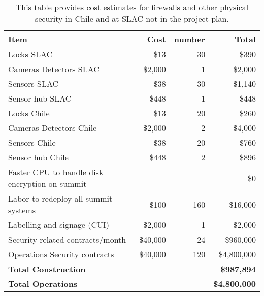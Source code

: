 \tiny \begin{longtable} {|p{}|r|r|r|} \caption{This table provides cost estimates for firewalls and other physical security in Chile and at SLAC not in the project plan. \label{tab:firewalls}}\\ 
\hline 
\textbf{Item}&\textbf{Cost}&\textbf{number}&\textbf{Total} \\ \hline
{Locks SLAC}&{\$13}&{30}&{\$390} \\ \hline
{Cameras Detectors  SLAC}&{\$2,000}&{1}&{\$2,000} \\ \hline
{Sensors SLAC}&{\$38}&{30}&{\$1,140} \\ \hline
{Sensor hub SLAC}&{\$448}&{1}&{\$448} \\ \hline
{Locks Chile}&{\$13}&{20}&{\$260} \\ \hline
{Cameras Detectors Chile}&{\$2,000}&{2}&{\$4,000} \\ \hline
{Sensors Chile}&{\$38}&{20}&{\$760} \\ \hline
{Sensor hub Chile}&{\$448}&{2}&{\$896} \\ \hline
{Faster CPU to handle disk encryption on summit}&{}&{}&{\$0} \\ \hline
{Labor to redeploy all summit systems}&{\$100}&{160}&{\$16,000} \\ \hline
{Labelling and signage (CUI)}&{\$2,000}&{1}&{\$2,000} \\ \hline
{Security related contracts/month}&{\$40,000}&{24}&{\$960,000} \\ \hline
{Operations Security contracts}&{\$40,000}&{120}&{\$4,800,000} \\ \hline
\textbf{Total Construction}&\textbf{}&\textbf{}&\textbf{\$987,894} \\ \hline
\textbf{Total Operations}&\textbf{}&\textbf{}&\textbf{\$4,800,000} \\ \hline
\end{longtable} \normalsize

